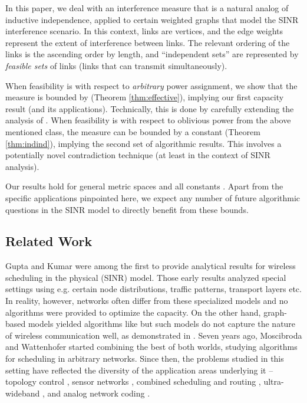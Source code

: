 \documentclass[11pt]{amsart}
\begin{document}
In this paper, we deal with an interference measure that is a natural analog of
inductive independence, applied to certain weighted graphs that model the SINR
interference scenario.
In this context, links are vertices, and the edge weights
represent the extent of interference between links. The relevant ordering
of the links is the ascending order by length, and ``independent sets'' are represented by \emph{feasible sets} of links (links that can transmit simultaneously).


When feasibility is with respect to \emph{arbitrary} power assignment, 
we show that the measure is
bounded by  (Theorem \ref{thm:effective}), implying
our first capacity result (and its applications). Technically, this is
done by carefully extending the analysis of
\cite{us:esa09full}. When feasibility is with respect to oblivious
power from the above mentioned class, the measure can be bounded by
a constant (Theorem \ref{thm:indind}), implying the second set of algorithmic
results. This involves a potentially novel contradiction technique (at least
in the context of SINR analysis).

Our results hold for general metric spaces and all constants .
Apart from the specific applications pinpointed here, we expect any number of
future algorithmic questions in the SINR model to directly benefit
from these bounds. 














\subsection{Related Work}\label{sec:related}
Gupta and Kumar \cite{kumar00} were among the first to provide analytical results for wireless scheduling in the physical (SINR) model. Those early results analyzed special settings using e.g. certain node distributions, traffic patterns, transport layers etc. In reality, however, networks often differ from these specialized models and no algorithms were provided to optimize the capacity. On the other hand, graph-based models yielded algorithms like \cite{parth05,ScheidelerRS08} but such models do not capture the nature of wireless communication well, as demonstrated in \cite{gronkvist01,MaheshwariJD08,Moscibroda2006Protocol}. Seven years ago, Moscibroda and Wattenhofer \cite{MoWa06} started combining the best of both worlds, studying algorithms for scheduling in arbitrary networks. Since then, the problems studied in
this setting have reflected the diversity of the application areas underlying it --  topology control \cite{gao08,stoc_topology11,moscibroda06b}, sensor networks \cite{Moscibroda07},
combined scheduling and routing \cite{chafekar07}, ultra-wideband \cite{HuaL06}, and analog network coding \cite{goussevskaia2008complexity}. 
\end{document}
